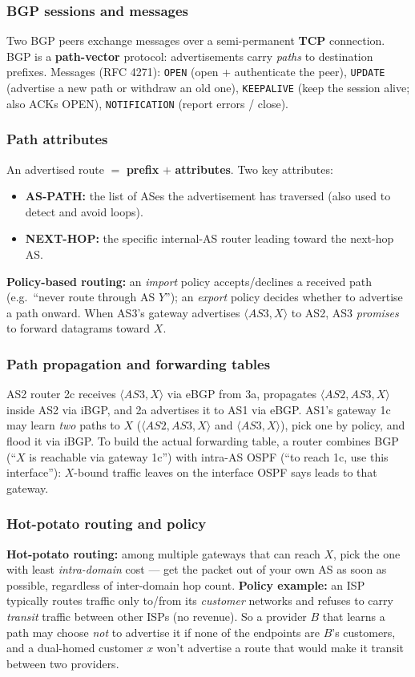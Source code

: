 \documentclass[hidelinks]{article}
\begin{document}
\subsubsection{BGP sessions and messages}
Two BGP peers exchange messages over a semi-permanent \textbf{TCP} connection.
BGP is a \textbf{path-vector} protocol: advertisements carry \emph{paths} to
destination prefixes. Messages (RFC 4271): \texttt{OPEN} (open + authenticate
the peer), \texttt{UPDATE} (advertise a new path or withdraw an old one),
\texttt{KEEPALIVE} (keep the session alive; also ACKs OPEN),
\texttt{NOTIFICATION} (report errors / close).

\subsubsection{Path attributes}
An advertised route $=$ \textbf{prefix} $+$ \textbf{attributes}. Two key
attributes:
\begin{itemize}
    \item \textbf{AS-PATH:} the list of ASes the advertisement has traversed
    (also used to detect and avoid loops).
    \item \textbf{NEXT-HOP:} the specific internal-AS router leading toward the
    next-hop AS.
\end{itemize}
\textbf{Policy-based routing:} an \emph{import} policy accepts/declines a
received path (e.g.\ ``never route through AS $Y$''); an \emph{export} policy
decides whether to advertise a path onward. When AS3's gateway advertises
$\langle AS3,X\rangle$ to AS2, AS3 \emph{promises} to forward datagrams toward
$X$.

\subsubsection{Path propagation and forwarding tables}
AS2 router 2c receives $\langle AS3,X\rangle$ via eBGP from 3a, propagates
$\langle AS2,AS3,X\rangle$ inside AS2 via iBGP, and 2a advertises it to AS1 via
eBGP. AS1's gateway 1c may learn \emph{two} paths to $X$
($\langle AS2,AS3,X\rangle$ and $\langle AS3,X\rangle$), pick one by policy, and
flood it via iBGP. To build the actual forwarding table, a router combines BGP
(``$X$ is reachable via gateway 1c'') with intra-AS OSPF (``to reach 1c, use
this interface''): $X$-bound traffic leaves on the interface OSPF says leads to
that gateway.

\subsubsection{Hot-potato routing and policy}
\textbf{Hot-potato routing:} among multiple gateways that can reach $X$, pick
the one with least \emph{intra-domain} cost --- get the packet out of your own
AS as soon as possible, regardless of inter-domain hop count.
\textbf{Policy example:} an ISP typically routes traffic only to/from its
\emph{customer} networks and refuses to carry \emph{transit} traffic between
other ISPs (no revenue). So a provider $B$ that learns a path may choose
\emph{not} to advertise it if none of the endpoints are $B$'s customers, and a
dual-homed customer $x$ won't advertise a route that would make it transit
between two providers.
\end{document}
